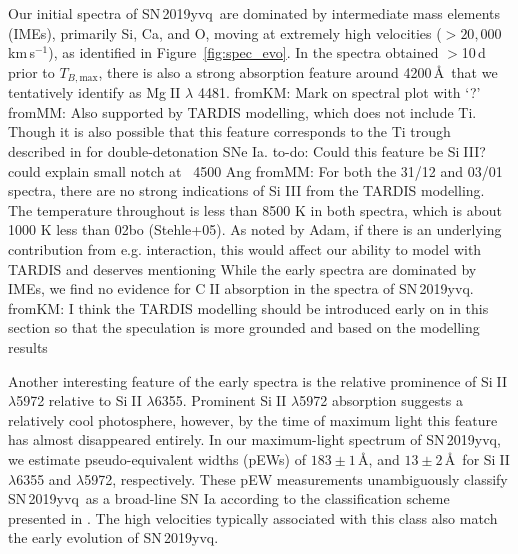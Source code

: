 \documentclass[twocolumn]{aastex63}
\def\ion#1#2{#1$\;${\footnotesize\rm{#2}}\relax}
\newcommand{\fromkate}[1]{{\color{brown} fromKM: {#1}}}
\newcommand{\frommark}[1]{{\color{orange} fromMM: {#1}}}
\newcommand{\todo}[1]{{\color{magenta} to-do: {#1}}}
\newcommand{\tbmax}{$T_{B,\mathrm{max}}$}
\newcommand{\kms}{km\,s$^{-1}$}
\newcommand{\sn}{SN\,2019yvq}
\begin{document}









Our initial spectra of \sn\ are dominated by intermediate mass elements
(IMEs), primarily Si, Ca, and O, moving at extremely high velocities ($>
20,000$\,\kms), as identified in Figure~\ref{fig:spec_evo}. In the spectra
obtained $>$10\,d prior to \tbmax, there is also a strong absorption feature
around 4200\,\AA\ that we tentatively identify as \ion{Mg}{II} $\lambda$ 4481. \fromkate{Mark on spectral plot with `?'}\frommark{Also supported by TARDIS modelling, which does not include Ti}.
Though it is also possible that this feature corresponds to the Ti trough
described in \citet{Polin19} for double-detonation SNe Ia. \todo{Could this
feature be \ion{Si}{III}? could explain small notch at ~4500 Ang} \frommark{For both the 31/12 and 03/01 spectra, there are no strong indications of Si III from the TARDIS modelling. The temperature throughout is less than 8500 K in both spectra, which is about 1000 K less than 02bo (Stehle+05). As noted by Adam, if there is an underlying contribution from e.g. interaction, this would affect our ability to model with TARDIS and deserves mentioning} While the
early spectra are dominated by IMEs, we find no evidence for \ion{C}{II}
absorption in the spectra of \sn. \fromkate{I think the TARDIS modelling should be introduced early on in this section so that the speculation is more grounded and based on the modelling results}

Another interesting feature of the early spectra is the relative prominence of
\ion{Si}{II} $\lambda$5972 relative to \ion{Si}{II} $\lambda$6355. Prominent
\ion{Si}{II} $\lambda$5972 absorption suggests a relatively cool photosphere,
however, by the time of maximum light this feature has almost disappeared
entirely. In our maximum-light spectrum of \sn, we estimate pseudo-equivalent
widths (pEWs) of $183\pm1$\,\AA, and $13\pm2$\,\AA\ for \ion{Si}{II}
$\lambda$6355 and $\lambda$5972, respectively. These pEW measurements
unambiguously classify \sn\ as a broad-line SN Ia according to the
classification scheme presented in \citet{Branch06}. The high velocities
typically associated with this class also match the early evolution of \sn.
\end{document}
